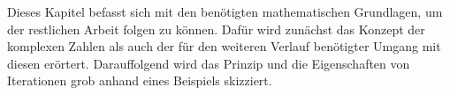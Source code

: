 
Dieses Kapitel befasst sich mit den ben\"otigten mathematischen Grundlagen, um
der restlichen Arbeit folgen zu k\"onnen.
Daf\"ur wird zun\"achst das Konzept der komplexen Zahlen als auch der f\"ur den weiteren
Verlauf ben\"otigter Umgang mit diesen er\"ortert.
Darauffolgend wird das Prinzip und die Eigenschaften von Iterationen grob
anhand eines Beispiels skizziert.


